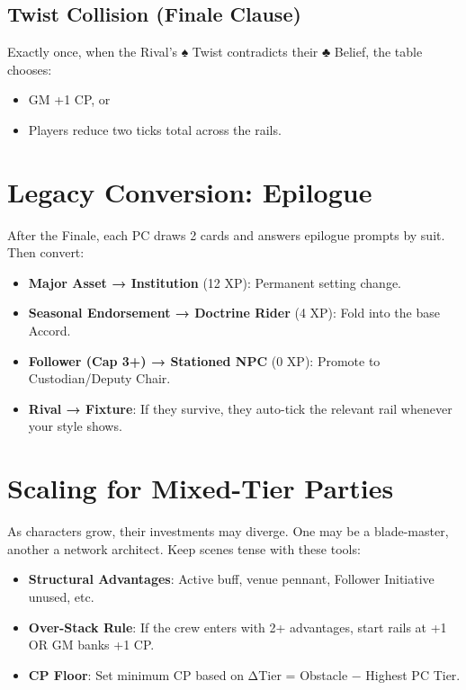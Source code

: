 \subsection*{Twist Collision (Finale Clause)}

Exactly once, when the Rival's ♠ Twist contradicts their ♣ Belief, the table chooses:

\begin{itemize}
    \item GM +1 CP, or
    \item Players reduce two ticks total across the rails.
\end{itemize}

\section*{Legacy Conversion: Epilogue}

After the Finale, each PC draws 2 cards and answers epilogue prompts by suit. Then convert:

\begin{itemize}
    \item \textbf{Major Asset → Institution} (12 XP): Permanent setting change.
    \item \textbf{Seasonal Endorsement → Doctrine Rider} (4 XP): Fold into the base Accord.
    \item \textbf{Follower (Cap 3+) → Stationed NPC} (0 XP): Promote to Custodian/Deputy Chair.
    \item \textbf{Rival → Fixture}: If they survive, they auto-tick the relevant rail whenever your style shows.
\end{itemize}

\section*{Scaling for Mixed-Tier Parties}

As characters grow, their investments may diverge. One may be a blade-master, another a network architect. Keep scenes tense with these tools:

\begin{itemize}
    \item \textbf{Structural Advantages}: Active buff, venue pennant, Follower Initiative unused, etc.
    \item \textbf{Over-Stack Rule}: If the crew enters with 2+ advantages, start rails at +1 OR GM banks +1 CP.
    \item \textbf{CP Floor}: Set minimum CP based on ΔTier = Obstacle − Highest PC Tier.
\end{itemize}

